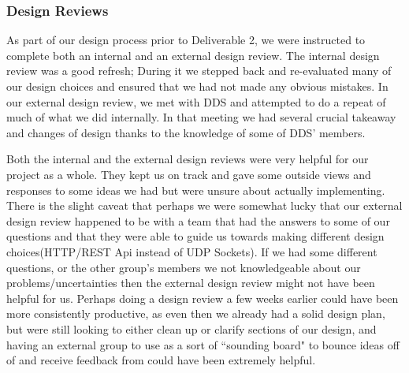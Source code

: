 \iffalse
\smallskip\subsubsection*{README file}
Early on in our development process, Justin (team lead) created a comprehensive README file in our Git repository that outlined much of our design decisions and expectations for API calls. By having this completed and accessible, it gave us a good location to both keep all of our design decisions updated, and also to use as a reference when answering questions from other teams. In addition, it gave us a place to point other components to look at if they had any questions about formatting/expectations and none of us were available to respond.
\medbreak
The full README can be found on our project \href{https://github.com/justinottesen/LSPT-Evaluation}{GitHub Repository}.
\fi

\smallskip\subsubsection*{Design Reviews}
As part of our design process prior to Deliverable 2, we were instructed to complete both an internal and an external design review. The internal design review was a good refresh; During it we stepped back and re-evaluated many of our design choices and ensured that we had not made any obvious mistakes. 
\smallbreak
In our external design review, we met with DDS and attempted to do a repeat of much of what we did internally. In that meeting we had several crucial takeaway and changes of design thanks to the knowledge of some of DDS' members.

\bigbreak
Both the internal and the external design reviews were very helpful for our project as a whole. They kept us on track and gave some outside views and responses to some ideas we had but were unsure about actually implementing. 
\smallbreak
There is the slight caveat that perhaps we were somewhat lucky that our external design review happened to be with a team that had the answers to some of our questions and that they were able to guide us towards making different design choices(HTTP/REST Api instead of UDP Sockets). If we had some different questions, or the other group's members we not knowledgeable about our problems/uncertainties then the external design review might not have been helpful for us. 
\smallbreak 
Perhaps doing a design review a few weeks earlier could have been more consistently productive, as even then we already had a solid design plan, but were still looking to either clean up or clarify sections of our design, and having an external group to use as a sort of ``sounding board" to bounce ideas off of and receive feedback from could have been extremely helpful. 

